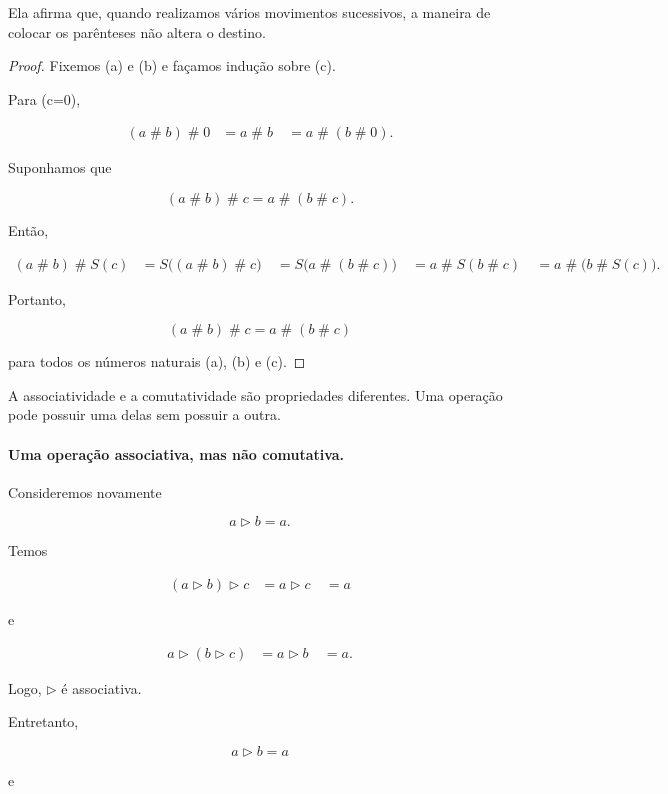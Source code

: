 \documentclass[12pt,a4paper]{article}
\newcommand{\mov}{\mathbin{\#}}
\begin{document}
Ela afirma que, quando realizamos vários movimentos sucessivos, a
maneira de colocar os parênteses não altera o destino.

\begin{proof}
Fixemos (a) e (b) e façamos indução sobre (c).

Para (c=0),

\[
\begin{aligned}
(a\mov b)\mov0
&=a\mov b\
&=a\mov(b\mov0).
\end{aligned}
\]

Suponhamos que

\[
(a\mov b)\mov c=a\mov(b\mov c).
\]

Então,

\[
\begin{aligned}
(a\mov b)\mov S(c)
&=S\bigl((a\mov b)\mov c\bigr)\
&=S\bigl(a\mov(b\mov c)\bigr)\
&=a\mov S(b\mov c)\
&=a\mov\bigl(b\mov S(c)\bigr).
\end{aligned}
\]

Portanto,

\[
(a\mov b)\mov c=a\mov(b\mov c)
\]

para todos os números naturais (a), (b) e (c).
\end{proof}

A associatividade e a comutatividade são propriedades diferentes. Uma
operação pode possuir uma delas sem possuir a outra.

\paragraph{Uma operação associativa, mas não comutativa.}

Consideremos novamente

\[
a\triangleright b=a.
\]

Temos

\[
\begin{aligned}
(a\triangleright b)\triangleright c
&=a\triangleright c\
&=a
\end{aligned}
\]

e

\[
\begin{aligned}
a\triangleright(b\triangleright c)
&=a\triangleright b\
&=a.
\end{aligned}
\]

Logo, $\triangleright$ é associativa.

Entretanto,

\[
a\triangleright b=a
\]

e
\end{document}
